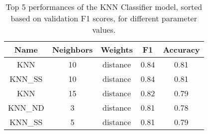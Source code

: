 \begin{table}[H]
	\centering
	\begin{tabular}{c c c c c}
	\hline
	\hline
	\textbf{Name} & \textbf{Neighbors} & \textbf{Weights} & \textbf{F1} & \textbf{Accuracy} \\ 
	\hline
	\hline
	KNN &  10 & distance & 0.84 & 0.81 \\ 
	KNN\_SS & 10 & distance & 0.84 & 0.81 \\ 
	KNN &  15 & distance & 0.82 & 0.79 \\ 
	KNN\_ND &  3 & distance & 0.81 & 0.78 \\ 
	KNN\_SS & 5 & distance & 0.81 & 0.79 \\ 
	\hline
	\end{tabular}

	\caption{Top 5 performances of the KNN Classifier model, sorted based on validation F1 scores, for different parameter values.}
	\label{tab:knn}
\end{table}

